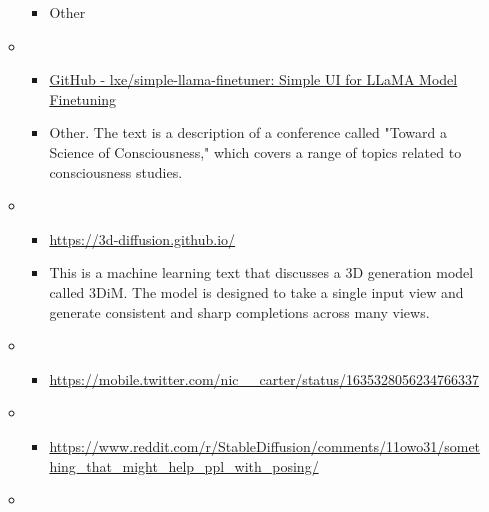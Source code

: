 \begin{itemize}
\begin{itemize}
\begin{itemize}
    \item
      Other
    \end{itemize}
  \item
    \begin{itemize}
     
    \item
      \href{https://github.com/lxe/simple-llama-finetuner}{GitHub -
      lxe/simple-llama-finetuner: Simple UI for LLaMA Model Finetuning}
    \end{itemize}

    \begin{itemize}
     
    \item
      Other. The text is a description of a conference called "Toward a
      Science of Consciousness," which covers a range of topics related
      to consciousness studies.
    \end{itemize}
  \item
    \begin{itemize}
     
    \item
      \url{https://3d-diffusion.github.io/}
    \end{itemize}

    \begin{itemize}
     
    \item
      This is a machine learning text that discusses a 3D generation
      model called 3DiM. The model is designed to take a single input
      view and generate consistent and sharp completions across many
      views.
    \end{itemize}
  \item
    \begin{itemize}
     
    \item
      \url{https://mobile.twitter.com/nic__carter/status/1635328056234766337}
    \end{itemize}
  \item
    \begin{itemize}
     
    \item
      \url{https://www.reddit.com/r/StableDiffusion/comments/11owo31/something_that_might_help_ppl_with_posing/}
    \end{itemize}
  \item
    \begin{itemize}
     

\end{itemize}
\end{itemize}
\end{itemize}
